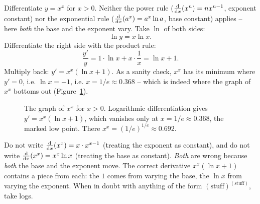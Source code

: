 \begin{example}
\label{ch12:ex-tower}
Differentiate $y = x^x$ for $x>0$. Neither the power rule
($\frac{\mathrm{d}}{\mathrm{d} x}\!\left(x^n\right)=nx^{n-1}$, exponent constant) nor the exponential rule
($\frac{\mathrm{d}}{\mathrm{d} x}\!\left(a^x\right)=a^x\ln a$, base constant) applies -- here \emph{both} the base
and the exponent vary. Take $\ln$ of both sides:
\[
   \ln y = x\ln x.
\]
Differentiate the right side with the product rule:
\[
   \frac{y'}{y} = 1\cdot \ln x + x\cdot\frac1x = \ln x + 1.
\]
Multiply back: $y' = x^x(\ln x + 1)$. As a sanity check, $x^x$ has its
minimum where $y'=0$, i.e. $\ln x = -1$, i.e. $x = 1/e \approx 0.368$ --
which is indeed where the graph of $x^x$ bottoms out
(Figure~\ref{ch12:fig-xtox}).
\end{example}

\begin{figure}[H]
\centering
{}
\caption{The graph of $x^x$ for $x>0$. Logarithmic differentiation gives
$y' = x^x(\ln x+1)$, which vanishes only at $x=1/e\approx 0.368$, the marked
low point. There $x^x = (1/e)^{1/e}\approx 0.692$.}
\label{ch12:fig-xtox}
\end{figure}

\begin{trapbox}
Do not write $\frac{\mathrm{d}}{\mathrm{d} x}\!\left(x^x\right) = x\cdot x^{x-1}$ (treating the exponent as
constant), and do not write $\frac{\mathrm{d}}{\mathrm{d} x}\!\left(x^x\right) = x^x\ln x$ (treating the base as
constant). \emph{Both} are wrong because \emph{both} the base and the
exponent move. The correct derivative $x^x(\ln x+1)$ contains a piece from
each: the $1$ comes from varying the base, the $\ln x$ from varying the
exponent. When in doubt with anything of the form
$(\text{stuff})^{(\text{stuff})}$, take logs.
\end{trapbox}

